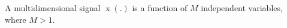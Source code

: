 A multidimensional signal $\operatorname{x}(.)$ is a function of $M$ independent variables, where $M > 1$.
